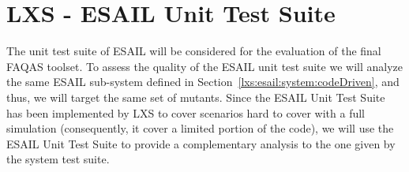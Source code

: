 \section{LXS - ESAIL Unit Test Suite}
\label{chapter:caseStudies:LXS:Unit}



The unit test suite of ESAIL will be considered for the evaluation of the final FAQAS toolset. 
To assess the quality of the ESAIL unit test suite we will analyze the same ESAIL sub-system defined in Section~\ref{lxs:esail:system:codeDriven}, and thus, we will target the same set of mutants. Since the ESAIL Unit Test Suite has been implemented by LXS to cover scenarios hard to cover with a full simulation (consequently, it cover a limited portion of the code), we will use the ESAIL Unit Test Suite to provide a complementary analysis to the one given by the system test suite.

